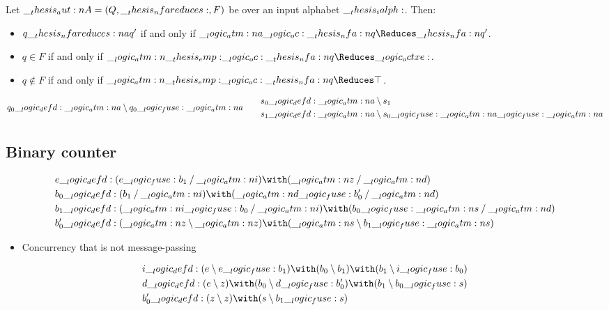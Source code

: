 \begin{theorem}
  Let $\aut{A} = (Q, \mathord{\nfareduces}, F)$ be  over an input alphabet $\__thesis_ialph:$.
  Then:
  \begin{itemize}[nosep]
  \item $q \nfareduces[a] q'$ if and only if $\atm{a} \oc \nfa{q} \Reduces \nfa{q}'$.
  \item $q \in F$ if and only if $\atm{\emp} \oc \nfa{q} \Reduces \octxe$.
  \item $q \notin F$ if and only if $\atm{\emp} \oc \nfa{q} \Reduces \top$.
  \end{itemize}
\end{theorem}

\begin{equation*}
  q_0 \defd \atm{a} \limp q_0 \fuse \atm{a}
  \qquad
  \begin{lgathered}
    s_0 \defd \atm{a} \limp s_1 \\
    s_1 \defd \atm{a} \limp s_0 \fuse \atm{a} \fuse \atm{a}
  \end{lgathered}
\end{equation*}

\subsection{Binary counter}

\begin{equation*}
  \begin{lgathered}
    e \defd (e \fuse b_1 \pmir \atm{i}) \with (\atm{z} \pmir \atm{d}) \\
    b_0 \defd (b_1 \pmir \atm{i}) \with (\atm{d} \fuse b'_0 \pmir \atm{d}) \\
    b_1 \defd (\atm{i} \fuse b_0 \pmir \atm{i}) \with (b_0 \fuse \atm{s} \pmir \atm{d}) \\
    b'_0 \defd (\atm{z} \limp \atm{z}) \with (\atm{s} \limp b_1 \fuse \atm{s})
  \end{lgathered}
\end{equation*}

\begin{itemize}
\item Concurrency that is not message-passing
\end{itemize}

\begin{equation*}
  \begin{lgathered}
    i \defd (e \limp e \fuse b_1) \with (b_0 \limp b_1) \with (b_1 \limp i \fuse b_0) \\
    d \defd (e \limp z) \with (b_0 \limp d \fuse b'_0) \with (b_1 \limp b_0 \fuse s) \\
    b'_0 \defd (z \limp z) \with (s \limp b_1 \fuse s)
  \end{lgathered}
\end{equation*}


